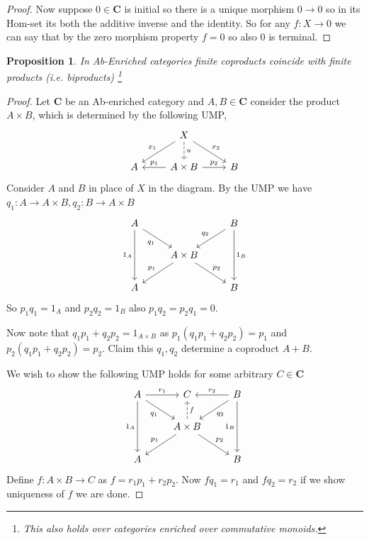 \documentclass[12pt]{article}
\numberwithin{equation}{section}
\newtheorem{proposition}{Proposition}[section]
\begin{document}
\begin{appendices}
\begin{proof}
			Now suppose $0 \in \mathbf{C}$ is initial so there is a unique morphism $0\to 0$ so in its Hom-set its both the additive inverse and the identity. So for any $f:X \to 0$ we can say that by the zero morphism property $f=0$ so also $0$ is terminal.
		\end{proof}
		\begin{proposition}
			In Ab-Enriched categories finite coproducts coincide with finite products (i.e. biproducts) \footnote{This also holds over categories enriched over commutative monoids.}
		\end{proposition}
		\begin{proof}	
			Let $\mathbf{C}$ be an Ab-enriched category and $A,B\in \mathbf{C}$ consider the product $A\times B$, which is determined by the following UMP,
			\[\begin{tikzcd}
				& X \\
				A & A\times B & B
				\arrow["{p_1}"', from=2-2, to=2-1]
				\arrow["{p_2}", from=2-2, to=2-3]
				\arrow["u", dashed, from=1-2, to=2-2]
				\arrow["{x_1}"', from=1-2, to=2-1]
				\arrow["{x_2}", from=1-2, to=2-3]
			\end{tikzcd}\]
			Consider $A$ and $B$ in place of $X $ in the diagram. By the UMP we have $q_1: A \to A\times B, q_2: B \to A\times B$
			\[\begin{tikzcd}
				A && B \\
				& {A\times B} \\
				A && B
				\arrow["{p_1}"', from=2-2, to=3-1]
				\arrow["{p_2}", from=2-2, to=3-3]
				\arrow["{q_2}"', from=1-3, to=2-2]
				\arrow["{q_1}"', from=1-1, to=2-2]
				\arrow["{1_A}"', from=1-1, to=3-1]
				\arrow["{1_B}", from=1-3, to=3-3]
			\end{tikzcd}\]
			So $p_1q_1=1_A$ and $p_2q_2=1_B$ also $p_1q_2=p_2q_1=0$.
			
			Now note that $q_1p_1+q_2p_2=1_{A\times B}$ as $p_1(q_1p_1+q_2p_2)=p_1$ and $p_2(q_1p_1+q_2p_2)=p_2$. Claim this $q_1,q_2$ determine a coproduct $A +B$.
			
			We wish to show the following UMP holds for some arbitrary $C \in \mathbf{C}$
			\[\begin{tikzcd}
				A & C & B \\
				& {A\times B} \\
				A && B
				\arrow["{q_1}"', from=1-1, to=2-2]
				\arrow["{q_2}", from=1-3, to=2-2]
				\arrow["{p_1}"', from=2-2, to=3-1]
				\arrow["{p_2}", from=2-2, to=3-3]
				\arrow["{1_B}"', from=1-3, to=3-3]
				\arrow["{1_A}"', from=1-1, to=3-1]
				\arrow["{r_1}", from=1-1, to=1-2]
				\arrow["{r_2}"', from=1-3, to=1-2]
				\arrow["{f}"',dashed, from=2-2, to=1-2]
			\end{tikzcd}\]
			Define $f: A\times B \to C$ as $f=r_1p_1+r_2p_2$. Now $fq_1=r_1$ and $fq_2=r_2$ if we show uniqueness of $f$ we are done.
			

\end{proof}
\end{appendices}
\end{document}
